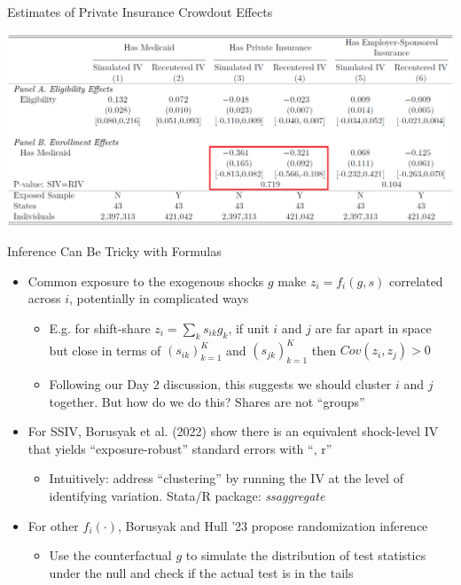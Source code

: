 \documentclass[11pt,english]{beamer}
\begin{document}
\begin{frame}{Estimates of Private Insurance Crowdout Effects}

\begin{center}
	\includegraphics[width=1\textwidth]{figures/aca_ss.png}
\end{center}

\end{frame}

\begin{frame}{Inference Can Be Tricky with Formulas}

\begin{itemize}
\item Common exposure to the exogenous shocks $g$ make $z_i=f_i(g,s)$ correlated across $i$, potentially in complicated ways\smallskip
\begin{itemize}
\item E.g. for shift-share $z_i=\sum_k s_{ik}g_k$, if unit $i$ and $j$ are far apart in space but close in terms of $(s_{ik})_{k=1}^K$ and $(s_{jk})_{k=1}^K$ then $Cov(z_i,z_j)>0$ \smallskip\pause{}
\item Following our Day 2 discussion, this suggests we should cluster $i$ and $j$ together.\pause{} But how do we do this? Shares are not ``groups''
\end{itemize}\bigskip\pause{}
\item For SSIV, Borusyak et al. (2022) show there is an equivalent shock-level IV that yields ``exposure-robust'' standard errors with ``, r''\smallskip
\begin{itemize}
\item Intuitively: address ``clustering'' by running the IV at the level of identifying variation. Stata/R package: \emph{ssaggregate}
\end{itemize}\bigskip\pause{}
\item For other $f_i(\cdot)$, Borusyak and Hull '23 propose randomization inference\smallskip
\begin{itemize}
\item Use the counterfactual $g$ to simulate the distribution of test statistics under the null and check if the actual test is in the tails
\end{itemize}
\end{itemize}
\end{frame}
\end{document}
